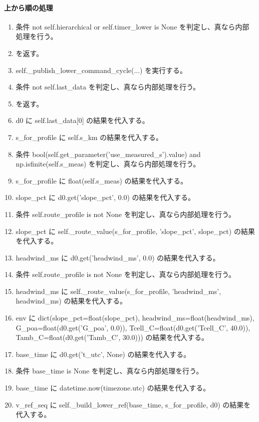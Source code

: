 \documentclass[a4paper,11pt]{article}
\begin{document}
            \paragraph{上から順の処理}
            \begin{enumerate}[leftmargin=1.8em]
            \item 条件 not self.hierarchical or self.timer\_lower is None を判定し、真なら内部処理を行う。
\item    を返す。
\item self.\_publish\_lower\_command\_cycle(...) を実行する。
\item 条件 not self.last\_data を判定し、真なら内部処理を行う。
\item    を返す。
\item d0 に self.last\_data[0] の結果を代入する。
\item s\_for\_profile に self.s\_km の結果を代入する。
\item 条件 bool(self.get\_parameter('use\_measured\_s').value) and np.isfinite(self.s\_meas) を判定し、真なら内部処理を行う。
\item   s\_for\_profile に float(self.s\_meas) の結果を代入する。
\item slope\_pct に d0.get('slope\_pct', 0.0) の結果を代入する。
\item 条件 self.route\_profile is not None を判定し、真なら内部処理を行う。
\item   slope\_pct に self.\_route\_value(s\_for\_profile, 'slope\_pct', slope\_pct) の結果を代入する。
\item headwind\_ms に d0.get('headwind\_ms', 0.0) の結果を代入する。
\item 条件 self.route\_profile is not None を判定し、真なら内部処理を行う。
\item   headwind\_ms に self.\_route\_value(s\_for\_profile, 'headwind\_ms', headwind\_ms) の結果を代入する。
\item env に dict(slope\_pct=float(slope\_pct), headwind\_ms=float(headwind\_ms), G\_poa=float(d0.get('G\_poa', 0.0)), Tcell\_C=float(d0.get('Tcell\_C', 40.0)), Tamb\_C=float(d0.get('Tamb\_C', 30.0))) の結果を代入する。
\item base\_time に d0.get('t\_utc', None) の結果を代入する。
\item 条件 base\_time is None を判定し、真なら内部処理を行う。
\item   base\_time に datetime.now(timezone.utc) の結果を代入する。
\item v\_ref\_seq に self.\_build\_lower\_ref(base\_time, s\_for\_profile, d0) の結果を代入する。

\end{enumerate}
\end{document}
